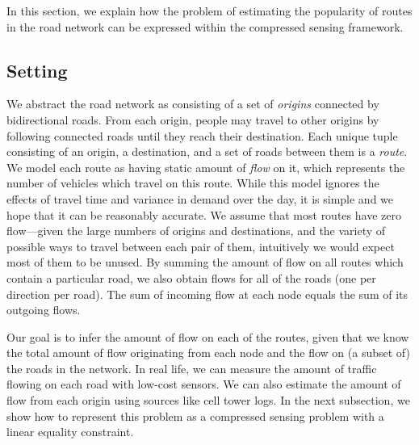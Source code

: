 \documentclass{article} %
\begin{document}
In this section, we explain how the problem of estimating the popularity of routes in the road network can be expressed within the compressed sensing framework.

\subsection{Setting}
We abstract the road network as consisting of a set of \emph{origins} connected by bidirectional roads.
From each origin, people may travel to other origins by following connected roads until they reach their destination.
Each unique tuple consisting of an origin, a destination, and a set of roads between them is a \emph{route}. 
We model each route as having static amount of \emph{flow} on it, which represents the number of vehicles which travel on this route.
While this model ignores the effects of travel time and variance in demand over the day, it is simple and we hope that it can be reasonably accurate.
We assume that most routes have zero flow---given the large numbers of origins and destinations, and the variety of possible ways to travel between each pair of them, intuitively we would expect most of them to be unused.
By summing the amount of flow on all routes which contain a particular road, we also obtain flows for all of the roads (one per direction per road).
The sum of incoming flow at each node equals the sum of its outgoing flows.

Our goal is to infer the amount of flow on each of the routes, given that we know the total amount of flow originating from each node and the flow on (a subset of) the roads in the network.
In real life, we can measure the amount of traffic flowing on each road with low-cost sensors.
We can also estimate the amount of flow from each origin using sources like cell tower logs.
In the next subsection, we show how to represent this problem as a compressed sensing problem with a linear equality constraint.
\end{document}
